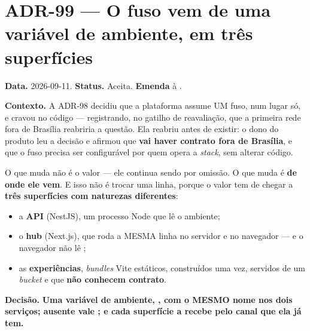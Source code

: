 \section{ADR-99 --- O fuso vem de uma variável de ambiente, em três superfícies}
\label{adr:fuso-configuravel}

\textbf{Data.} 2026-09-11. \textbf{Status.} Aceita.
\textbf{Emenda} à .

\textbf{Contexto.} A ADR-98 decidiu que a plataforma assume UM fuso, num lugar
só, e cravou  no código --- registrando, no gatilho de
reavaliação, que a primeira rede fora de Brasília reabriria a questão. Ela
reabriu antes de existir: o dono do produto leu a decisão e afirmou que
\textbf{vai haver contrato fora de Brasília}, e que o fuso precisa ser
configurável por quem opera a \emph{stack}, sem alterar código.

O que muda não é o valor --- ele continua sendo  por
omissão. O que muda é \textbf{de onde ele vem}. E isso não é trocar uma linha,
porque o valor tem de chegar a \textbf{três superfícies com naturezas
diferentes}:

\begin{itemize}
  \item a \textbf{API} (NestJS), um processo Node que lê o ambiente;
  \item o \textbf{hub} (Next.js), que roda a MESMA linha no servidor e no
    navegador --- e o navegador não lê ;
  \item as \textbf{experiências}, \emph{bundles} Vite estáticos, construídos uma
    vez, servidos de um \emph{bucket} e que \textbf{não conhecem contrato}.
\end{itemize}

\textbf{Decisão.} \textbf{Uma variável de ambiente,
, com o MESMO nome nos dois serviços; ausente vale
; e cada superfície a recebe pelo canal que ela já tem.}

